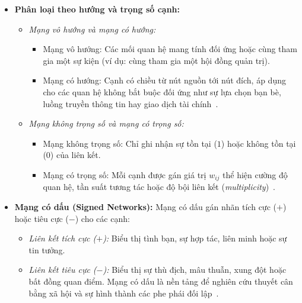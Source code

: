 \documentclass[14pt,a4paper]{extarticle}
\begin{document}
\begin{itemize}
    \item \textbf{Phân loại theo hướng và trọng số cạnh:}
    \begin{itemize}
        \item \textit{Mạng vô hướng và mạng có hướng:}
        \begin{itemize}
            \item Mạng vô hướng: Các mối quan hệ mang tính đối ứng hoặc cùng tham gia một sự kiện (ví dụ: cùng tham gia một hội đồng quản trị).
            \item Mạng có hướng: Cạnh có chiều từ nút nguồn tới nút đích, áp dụng cho các quan hệ không bắt buộc đối ứng như sự lựa chọn bạn bè, luồng truyền thông tin hay giao dịch tài chính~\cite{Scott2012}.
        \end{itemize}
        \item \textit{Mạng không trọng số và mạng có trọng số:}
        \begin{itemize}
            \item Mạng không trọng số: Chỉ ghi nhận sự tồn tại ($1$) hoặc không tồn tại ($0$) của liên kết.
            \item Mạng có trọng số: Mỗi cạnh được gán giá trị $w_{ij}$ thể hiện cường độ quan hệ, tần suất tương tác hoặc độ bội liên kết (\textit{multiplicity})~\cite{Traag2014}.
        \end{itemize}
    \end{itemize}

    \item \textbf{Mạng có dấu (Signed Networks):}
    \newline
    Mạng có dấu gán nhãn tích cực ($+$) hoặc tiêu cực ($-$) cho các cạnh:
    \begin{itemize}
        \item \textit{Liên kết tích cực ($+$):} Biểu thị tình bạn, sự hợp tác, liên minh hoặc sự tin tưởng.
        \item \textit{Liên kết tiêu cực ($-$):} Biểu thị sự thù địch, mâu thuẫn, xung đột hoặc bất đồng quan điểm. Mạng có dấu là nền tảng để nghiên cứu thuyết cân bằng xã hội và sự hình thành các phe phái đối lập~\cite{Traag2014}.
    \end{itemize}


\end{itemize}
\end{document}
